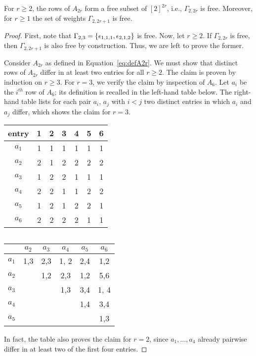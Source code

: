 \begin{prop} \label{prop:freeQubits}
	For $r \geq 2$, the rows of $A_{2r}$ form a free subset of $[2]^{2r}$, i.e., $\Gamma_{2,2r}$ is free. Moreover, for $r \geq 1$ the set of weights $\Gamma_{2,2r+1}$ is free.
\end{prop}

\begin{proof}
	First, note that $\Gamma_{2,3} = \{ \epsilon_{1,1,1}, \epsilon_{2,1,2} \}$ is free. Now, let $r \geq 2$. If $\Gamma_{2,2r}$ is free, then $\Gamma_{2,2r+1}$ is also free by construction. Thus, we are left to prove the former.
	
	Consider $A_{2r}$ as defined in Equation~\eqref{eq:defA2r}. We must show that distinct rows of $A_{2r}$ differ in at least two entries for all $r \geq 2$. The claim is proven by induction on $r \geq 3$. For $r = 3$, we verify the claim by inspection of $A_6$. Let $a_i$ be the $i^{th}$ row of $A_6$; its definition is recalled in the left-hand table below. The right-hand table lists for each pair $a_i$, $a_j$ with $i < j$ two distinct entries in which $a_i$ and $a_j$ differ, which shows the claim for $r=3$.
	\begin{center}
		\begin{tabular}{|c||c|c|c|c|c|c|}
			\hline 
			entry & 1 & 2 & 3 & 4 & 5 & 6 \\ 
			\hline 
			\hline
			$a_1$ & 1 & 1 & 1 & 1 & 1 & 1 \\ 
			\hline 
			$a_2$ & 2 & 1 & 2 & 2 & 2 & 2 \\ 
			\hline 
			$a_3$ & 1 & 2 & 2 & 1 & 1 & 1 \\ 
			\hline 
			$a_4$ & 2 & 2 & 1 & 1 & 2 & 2 \\ 
			\hline 
			$a_5$ & 1 & 2 & 1 & 2 & 2 & 1 \\ 
			\hline 
			$a_6$ & 2 & 2 & 2 & 2 & 1 & 1 \\ 
			\hline 
		\end{tabular} $\qquad \qquad$
		\begin{tabular}{|c||c|c|c||c|c|}
			\hline 
			& $a_2$ & $a_3$ & $a_4$ & $a_5$ & $a_6$ \\ 
			\hline \hline
			$a_1$  & 1,3 & 2,3 & 1, 2 & 2,4 & 1,2 \\ 
			\hline 
			$a_2$ & & 1,2 & 2,3 & 1,2 & 5,6 \\ 
			\hline 
			$a_3$ & & & 1,3 & 3,4 & 1, 4 \\ 
			\hline \hline
			$a_4$ & & & & 1,4 & 3,4 \\ 
			\hline 
			$a_5$ & & & & & 1,3 \\ 
			\hline 
		\end{tabular} 
	\end{center}
	In fact, the table also proves the claim for $r=2$, since $a_1,\ldots,a_4$ already pairwise differ in at least two of the first four entries.
	

\end{proof}
